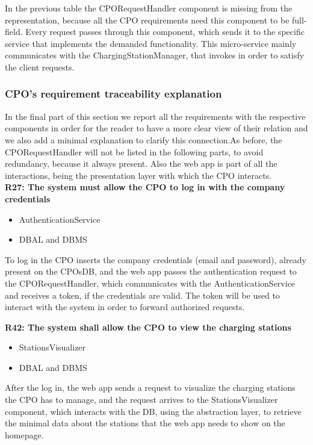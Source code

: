 In the previous table the CPORequestHandler component is missing from the representation, because all the CPO requirements need this component to be full-field. Every request passes through this component, which sends it to the specific service that implements the demanded functionality. This micro-service mainly communicates with the ChargingStationManager, that invokes in order to satisfy the client requests.

\subsubsection{CPO's requirement traceability explanation}
In the final part of this section we report all the requirements with the respective components in order for the reader to have a more clear view of their relation and we also add a minimal explanation to clarify this connection.As before, the CPORequestHandler will not be listed in the following parts, to avoid redundancy, because it always present. Also the web app is part of all the interactions, being the presentation layer with which the CPO interacts.\\

\textbf{R27: The system must allow the CPO to log in with the company credentials}
\begin{itemize}
    \item AuthenticationService
    \item DBAL and DBMS
\end{itemize}
To log in the CPO inserts the company credentials (email and password), already present on the CPOsDB, and the web app passes the authentication request to the CPORequestHandler, which communicates with the AuthenticationService and receives a token, if the credentials are valid. The token will be used to interact with the system in order to forward authorized requests.
\pagebreak


\textbf{R42: The system shall allow the CPO to view the charging stations}
\begin{itemize}
    \item StationsVisualizer
    \item DBAL and DBMS
\end{itemize}
After the log in, the web app sends a request to visualize the charging stations the CPO has to manage, and the request arrives to the StationsVisualizer component, which interacts with the DB, using the abstraction layer, to retrieve the minimal data about the stations that the web app needs to show on the homepage.

